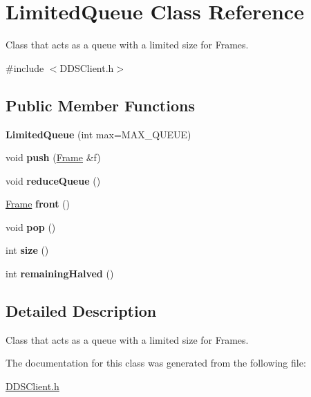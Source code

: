 \hypertarget{class_limited_queue}{\section{Limited\+Queue Class Reference}
\label{class_limited_queue}
}


Class that acts as a queue with a limited size for Frames.  




{\ttfamily \#include $<$D\+D\+S\+Client.\+h$>$}

\subsection*{Public Member Functions}
\begin{DoxyCompactItemize}
\item 
\hypertarget{class_limited_queue_a8662be2f2126546e2cc35a0c1a3288b5}{{\bfseries Limited\+Queue} (int max=M\+A\+X\+\_\+\+Q\+U\+E\+U\+E)}\label{class_limited_queue_a8662be2f2126546e2cc35a0c1a3288b5}

\item 
\hypertarget{class_limited_queue_a0ded894c203bf8d4ce6fd2a6266b8dee}{void {\bfseries push} (\hyperlink{struct_frame}{Frame} \&f)}\label{class_limited_queue_a0ded894c203bf8d4ce6fd2a6266b8dee}

\item 
\hypertarget{class_limited_queue_abe2132dfba699ca062d2d4b2e6a15172}{void {\bfseries reduce\+Queue} ()}\label{class_limited_queue_abe2132dfba699ca062d2d4b2e6a15172}

\item 
\hypertarget{class_limited_queue_aab4b64ea7239ce1df3e92c32e69f36bc}{\hyperlink{struct_frame}{Frame} {\bfseries front} ()}\label{class_limited_queue_aab4b64ea7239ce1df3e92c32e69f36bc}

\item 
\hypertarget{class_limited_queue_a1ca6b83ee0ac44d9ffa4e903c4dfa0e3}{void {\bfseries pop} ()}\label{class_limited_queue_a1ca6b83ee0ac44d9ffa4e903c4dfa0e3}

\item 
\hypertarget{class_limited_queue_a01187e2fcfa91ca29fda18f6d913e108}{int {\bfseries size} ()}\label{class_limited_queue_a01187e2fcfa91ca29fda18f6d913e108}

\item 
\hypertarget{class_limited_queue_ab08d0ed1c58715dc9b6a165557591257}{int {\bfseries remaining\+Halved} ()}\label{class_limited_queue_ab08d0ed1c58715dc9b6a165557591257}

\end{DoxyCompactItemize}


\subsection{Detailed Description}
Class that acts as a queue with a limited size for Frames. 

The documentation for this class was generated from the following file\+:\begin{DoxyCompactItemize}
\item 
\hyperlink{_d_d_s_client_8h}{D\+D\+S\+Client.\+h}\end{DoxyCompactItemize}
